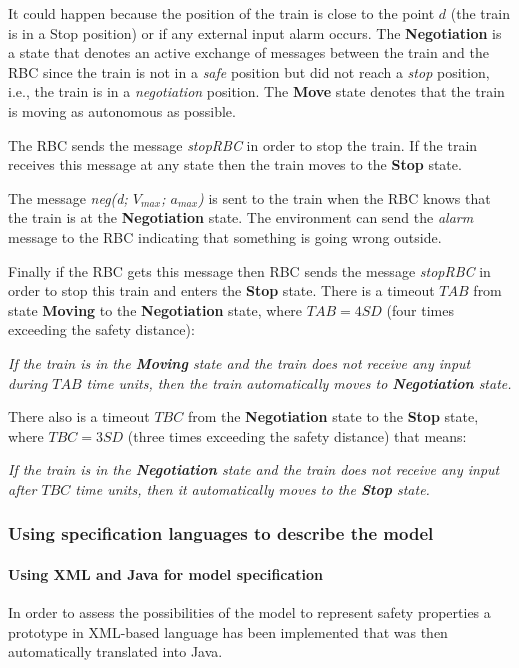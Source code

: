 \documentclass{template/openetcs_article}
\begin{document}
It could happen because the position of the train is close to the point $d$ (the train is in a Stop position) or if any external input alarm occurs. The \textbf{Negotiation} is a state that denotes an active exchange of messages between the train and the RBC since the train is not in a \textit{safe} position but did not reach a \textit{stop} position, i.e., the train is in a \textit{negotiation} position. The \textbf{Move} state denotes that the train is moving as autonomous as possible.

The RBC sends the message \textit{stopRBC} in order to stop the train. If the train receives this message at any state then the train moves to the \textbf{Stop} state. 

The message \textit{neg(d; $V_{max}$; $a_{max}$)} is sent to the train when the RBC knows that the train is at the \textbf{Negotiation} state. The environment can send the \textit{alarm} message to the RBC indicating that something is going wrong outside. 

Finally if the RBC gets this message then RBC sends the message \textit{stopRBC} in order to stop this train and enters the \textbf{Stop} state. There is a timeout $TAB$ from state \textbf{Moving} to the \textbf{Negotiation} state, where $TAB = 4 SD$ (four times exceeding the safety distance): 

\textit{If the train is in the \textbf{Moving} state and the train does not receive any input during $TAB$ time units, then the train automatically moves to \textbf{Negotiation} state.}

There also is a timeout $TBC$ from the \textbf{Negotiation} state to the \textbf{Stop} state, where $TBC = 3 SD$ (three times exceeding the safety distance) that means:

\textit{If the train is in the \textbf{Negotiation} state and the train does not receive any input after $TBC$ time units, then it automatically moves to the \textbf{Stop} state.}

\subsubsection{Using specification languages to describe the model}

\paragraph{Using XML and Java for model specification}

In order to assess the possibilities of the model to represent safety properties a prototype in XML-based language has been implemented that was then automatically translated into Java.
\end{document}
